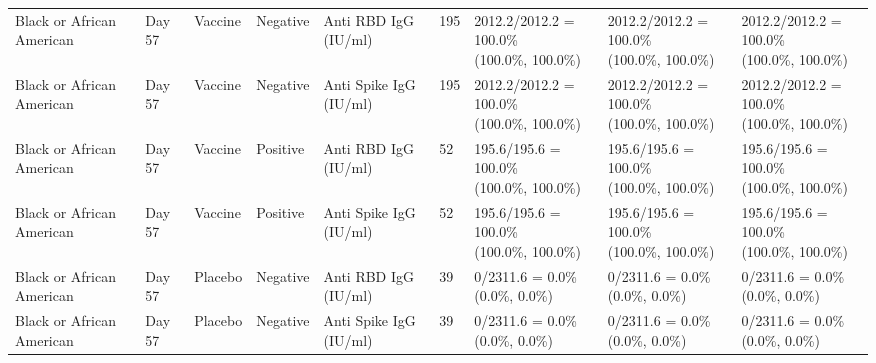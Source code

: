 \documentclass[]{book}
\theoremstyle{definition}
\theoremstyle{definition}
\theoremstyle{definition}
\newcommand{\1}{\mathbbm{1}}
\begin{document}
\begin{landscape}
\begin{ThreePartTable}
\begin{longtable}[t]{>{\raggedright\arraybackslash}p{2.7cm}llllllll}
\hspace{1em}Black or African American & Day 57 & Vaccine & Negative & Anti RBD IgG (IU/ml) & 195 & \makecell[l]{2012.2/2012.2 = 100.0\%\\(100.0\%, 100.0\%)} & \makecell[l]{2012.2/2012.2 = 100.0\%\\(100.0\%, 100.0\%)} & \makecell[l]{2012.2/2012.2 = 100.0\%\\(100.0\%, 100.0\%)}\\
\hspace{1em}Black or African American & Day 57 & Vaccine & Negative & Anti Spike IgG (IU/ml) & 195 & \makecell[l]{2012.2/2012.2 = 100.0\%\\(100.0\%, 100.0\%)} & \makecell[l]{2012.2/2012.2 = 100.0\%\\(100.0\%, 100.0\%)} & \makecell[l]{2012.2/2012.2 = 100.0\%\\(100.0\%, 100.0\%)}\\
\hspace{1em}Black or African American & Day 57 & Vaccine & Positive & Anti RBD IgG (IU/ml) & 52 & \makecell[l]{195.6/195.6 = 100.0\%\\(100.0\%, 100.0\%)} & \makecell[l]{195.6/195.6 = 100.0\%\\(100.0\%, 100.0\%)} & \makecell[l]{195.6/195.6 = 100.0\%\\(100.0\%, 100.0\%)}\\
\hspace{1em}Black or African American & Day 57 & Vaccine & Positive & Anti Spike IgG (IU/ml) & 52 & \makecell[l]{195.6/195.6 = 100.0\%\\(100.0\%, 100.0\%)} & \makecell[l]{195.6/195.6 = 100.0\%\\(100.0\%, 100.0\%)} & \makecell[l]{195.6/195.6 = 100.0\%\\(100.0\%, 100.0\%)}\\
\hspace{1em}Black or African American & Day 57 & Placebo & Negative & Anti RBD IgG (IU/ml) & 39 & \makecell[l]{0/2311.6 = 0.0\%\\(0.0\%, 0.0\%)} & \makecell[l]{0/2311.6 = 0.0\%\\(0.0\%, 0.0\%)} & \makecell[l]{0/2311.6 = 0.0\%\\(0.0\%, 0.0\%)}\\
\hspace{1em}Black or African American & Day 57 & Placebo & Negative & Anti Spike IgG (IU/ml) & 39 & \makecell[l]{0/2311.6 = 0.0\%\\(0.0\%, 0.0\%)} & \makecell[l]{0/2311.6 = 0.0\%\\(0.0\%, 0.0\%)} & \makecell[l]{0/2311.6 = 0.0\%\\(0.0\%, 0.0\%)}\\

\end{longtable}
\end{ThreePartTable}
\end{landscape}
\end{document}
